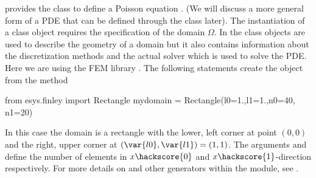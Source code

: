 \escript provides the class \Poisson to define a Poisson equation .
(We will discuss a more general form of a PDE  
that can be defined through the \LinearPDE class later). The instantiation of
a \Poisson class object requires the specification of the domain $\Omega$. In \escript
the \Domain class objects are used to describe the geometry of a domain but it also
contains information about the discretization methods and the actual solver which is used
to solve the PDE. Here we are using the FEM library \finley {}. The following statements create the \Domain object  from the 
\finley method 
\begin{python}
from esys.finley import Rectangle
mydomain = Rectangle(l0=1.,l1=1.,n0=40, n1=20)
\end{python}
In this case the domain is a rectangle with the lower, left corner at point $(0,0)$ and
the right, upper corner at $(\var{l0},\var{l1})=(1,1)$.
The arguments  and  define the number of elements in $x\hackscore{0}$ and
$x\hackscore{1}$-direction respectively. For more details on  and
other \Domain generators within the \finley module,
see .

